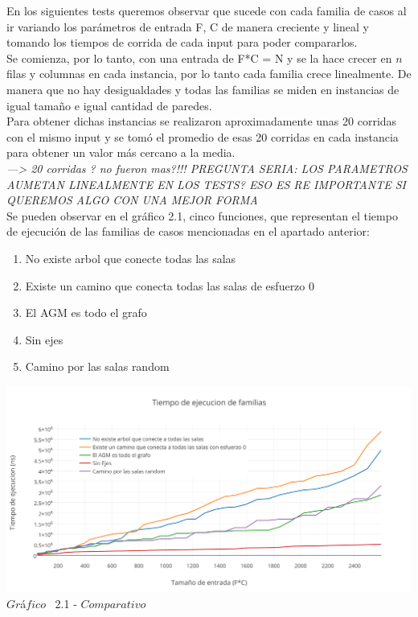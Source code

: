 \indent En los siguientes tests queremos observar que sucede con cada familia de casos al ir variando los parámetros de entrada F, C de manera creciente y lineal y tomando los tiempos de corrida de cada input para poder compararlos.\\
Se comienza, por lo tanto, con una entrada de F*C = N y se la hace crecer en $n$ filas y columnas en cada instancia, por lo tanto cada familia crece linealmente. De manera que no hay desigualdades y todas las familias se miden en instancias de igual tamaño e igual cantidad de paredes.\\

Para obtener dichas instancias se realizaron aproximadamente unas 20 corridas con el mismo input y se tom\'o el promedio de esas 20 corridas en cada instancia para obtener un valor m\'as cercano a la media.\\ 

\textit{---> 20 corridas ? no fueron mas?!!! PREGUNTA SERIA: LOS PARAMETROS AUMETAN LINEALMENTE EN LOS TESTS? ESO ES RE IMPORTANTE SI QUEREMOS ALGO CON UNA MEJOR FORMA}\\

Se pueden observar en el  gráfico 2.1, cinco funciones, que representan el tiempo de ejecuci\'on de las familias de casos mencionadas en el apartado anterior:\\

\begin{enumerate}
\item No existe arbol que conecte todas las salas
\item Existe un camino que conecta todas las salas de esfuerzo 0
\item El AGM es todo el grafo
\item Sin ejes
\item Camino por las salas random
\end{enumerate}

\vspace*{0.3cm} \vspace*{0.3cm}
  \begin{center}
 \includegraphics[scale=0.65]{./EJ2/comparativo.png}
 {$Gr$\'a$fico$ \ 2.1 - $Comparativo$}
  \end{center}
  \vspace*{0.3cm}
 

